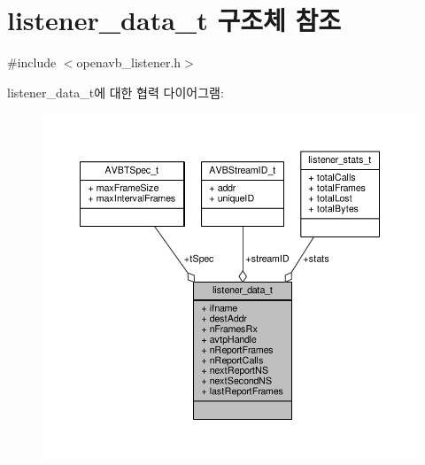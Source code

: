 \hypertarget{structlistener__data__t}{}\section{listener\+\_\+data\+\_\+t 구조체 참조}
\label{structlistener__data__t}


{\ttfamily \#include $<$openavb\+\_\+listener.\+h$>$}



listener\+\_\+data\+\_\+t에 대한 협력 다이어그램\+:
\nopagebreak
\begin{figure}[H]
\begin{center}
\leavevmode
\includegraphics[width=350pt]{structlistener__data__t__coll__graph}
\end{center}
\end{figure}

